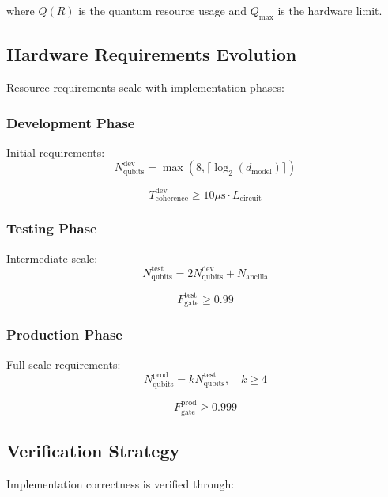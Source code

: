 \documentclass{article}
\begin{document}
where $Q(R)$ is the quantum resource usage and $Q_{\text{max}}$ is the hardware limit.

\subsection{Hardware Requirements Evolution}
Resource requirements scale with implementation phases:

\subsubsection{Development Phase}
Initial requirements:
\begin{equation}
N_{\text{qubits}}^{\text{dev}} = \max(8, \lceil\log_2(d_{\text{model}})\rceil)
\end{equation}

\begin{equation}
T_{\text{coherence}}^{\text{dev}} \geq 10\mu\text{s} \cdot L_{\text{circuit}}
\end{equation}

\subsubsection{Testing Phase}
Intermediate scale:
\begin{equation}
N_{\text{qubits}}^{\text{test}} = 2N_{\text{qubits}}^{\text{dev}} + N_{\text{ancilla}}
\end{equation}

\begin{equation}
F_{\text{gate}}^{\text{test}} \geq 0.99
\end{equation}

\subsubsection{Production Phase}
Full-scale requirements:
\begin{equation}
N_{\text{qubits}}^{\text{prod}} = kN_{\text{qubits}}^{\text{test}}, \quad k \geq 4
\end{equation}

\begin{equation}
F_{\text{gate}}^{\text{prod}} \geq 0.999
\end{equation}

\subsection{Verification Strategy}
Implementation correctness is verified through:
\end{document}
